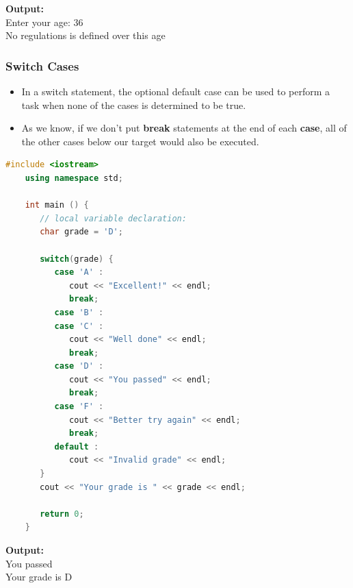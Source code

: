 \documentclass[12pt , a4paper]{article}
\newcommand{\hl}[1]{\colorbox{coolblack}{\color{cream}\textbf{#1}\color{black}}}
\begin{document}
	\begin{tcolorbox}
	\textbf{Output:}\\
	Enter your age: 36\\
	No regulations is defined over this age
	\end{tcolorbox}
	\subsubsection{Switch Cases}
		\begin{itemize}
			\item In a switch statement, the optional default case can be used to perform a task when none of the cases is determined to be true.\\
			\item As we know, if we don't put \hl{break} statements at the end of each \hl{case}, all of the other cases below our target would also be executed.\\
		\end{itemize}
	
	\begin{lstlisting}[language=C++]
	#include <iostream>
	using namespace std;
	 
	int main () {
	   // local variable declaration:
	   char grade = 'D';
	
	   switch(grade) {
	      case 'A' :
	         cout << "Excellent!" << endl; 
	         break;
	      case 'B' :
	      case 'C' :
	         cout << "Well done" << endl;
	         break;
	      case 'D' :
	         cout << "You passed" << endl;
	         break;
	      case 'F' :
	         cout << "Better try again" << endl;
	         break;
	      default :
	         cout << "Invalid grade" << endl;
	   }
	   cout << "Your grade is " << grade << endl;
	 
	   return 0;
	}
	\end{lstlisting}

	\begin{tcolorbox}
	\textbf{Output:}\\
	You passed\\
	Your grade is D
	\end{tcolorbox}
	
\end{document}
